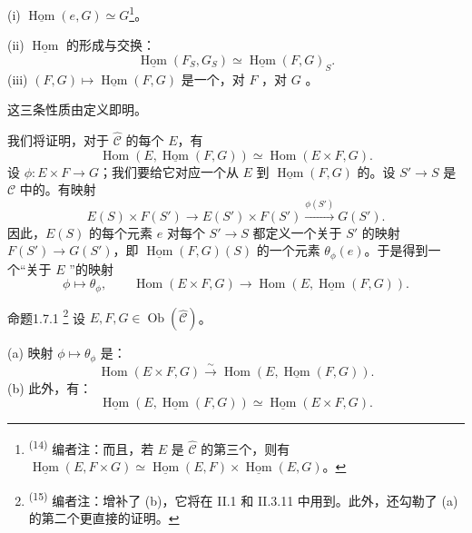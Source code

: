 (i) $\underline{\operatorname{Hom}}(e,G)\simeq G$\footnote{\textsuperscript{(14)} 编者注：而且，若 $E$ 是 $\widehat{\mathcal C}$ 的第三个，则有 $\underline{\operatorname{Hom}}(E,F\times G)\simeq\underline{\operatorname{Hom}}(E,F)\times\underline{\operatorname{Hom}}(E,G)$。}。

(ii) $\underline{\operatorname{Hom}}$ 的形成与交换：
\[
\underline{\operatorname{Hom}}(F_S,G_S)\simeq\underline{\operatorname{Hom}}(F,G)_S.
\]
(iii) $(F,G)\mapsto\underline{\operatorname{Hom}}(F,G)$ 是一个，对 $F$ ，对 $G$ 。

这三条性质由定义即明。

我们将证明，对于 $\widehat{\mathcal C}$ 的每个 $E$，有
\[
\operatorname{Hom}(E,\underline{\operatorname{Hom}}(F,G))\simeq\operatorname{Hom}(E\times F,G).
\]
设 $\phi:E\times F\to G$；我们要给它对应一个从 $E$ 到 $\underline{\operatorname{Hom}}(F,G)$ 的。设 $S'\to S$ 是 $\mathcal C$ 中的。有映射
\[
E(S)\times F(S')\longrightarrow E(S')\times F(S')\xrightarrow{\phi(S')}G(S').
\]
因此，$E(S)$ 的每个元素 $e$ 对每个 $S'\to S$ 都定义一个关于 $S'$ 的映射 $F(S')\to G(S')$，即 $\underline{\operatorname{Hom}}(F,G)(S)$ 的一个元素 $\theta_\phi(e)$。于是得到一个“关于 $E$ ”的映射
\[
\phi\longmapsto\theta_\phi,\qquad
\operatorname{Hom}(E\times F,G)\longrightarrow\operatorname{Hom}(E,\underline{\operatorname{Hom}}(F,G)).
\]
\begin{SGAresult}{命题}{1.7.1}
\footnote{\textsuperscript{(15)} 编者注：增补了 (b)，它将在 II.1 和 II.3.11 中用到。此外，还勾勒了 (a) 的第二个更直接的证明。}
设 $E,F,G\in\operatorname{Ob}(\widehat{\mathcal C})$。

(a) 映射 $\phi\mapsto\theta_\phi$ 是：
\[
\operatorname{Hom}(E\times F,G)\xrightarrow{\sim}\operatorname{Hom}(E,\underline{\operatorname{Hom}}(F,G)).
\]
(b) 此外，有：
\[
\underline{\operatorname{Hom}}(E,\underline{\operatorname{Hom}}(F,G))\simeq\underline{\operatorname{Hom}}(E\times F,G).
\]
\end{SGAresult}
